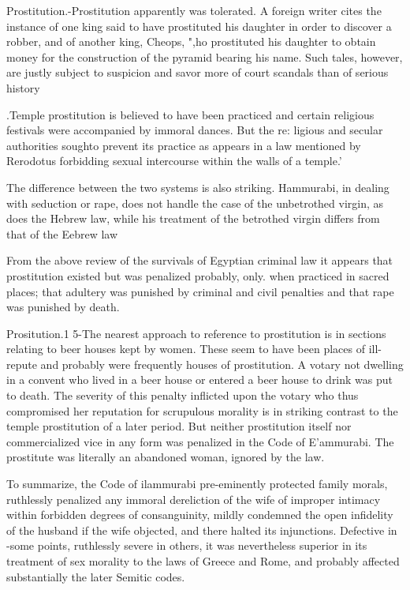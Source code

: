 \documentclass[11pt]{article}
\begin{document}
Prostitution.-Prostitution apparently was tolerated. A foreign
writer cites the instance of one king said to have prostituted his daughter in order to discover a robber, and of another king, Cheops, ",ho prostituted his daughter to obtain money for the construction of the
pyramid bearing his name. Such tales, however, are justly subject to
suspicion and savor more of court scandals than of serious history

.Temple prostitution is believed to have been practiced and certain
religious festivals were accompanied by immoral dances. But the re:
ligious and secular authorities soughto prevent its practice as appears
in a law mentioned by Rerodotus forbidding sexual intercourse within
the walls of a temple.' 



The difference between the two systems is also striking. Hammurabi, in dealing with seduction or rape, does not handle the case of
the unbetrothed virgin, as does the Hebrew law, while his treatment of
the betrothed virgin differs from that of the Eebrew law

From the above review of the survivals of Egyptian criminal law
it appears that prostitution existed but was penalized probably, only.
when practiced in sacred places; that adultery was punished by criminal
and civil penalties and that rape was punished by death.

Prositution.1 5-The nearest approach to reference to prostitution is
in sections relating to beer houses kept by women. These seem to have been
places of ill-repute and probably were frequently houses of prostitution. A votary not dwelling in a convent who lived in a beer house or
entered a beer house to drink was put to death. The severity of this
penalty inflicted upon the votary who thus compromised her reputation for scrupulous morality is in striking contrast to the temple prostitution of a later period. But neither prostitution itself nor commercialized vice in any form was penalized in the Code of E'ammurabi.
The prostitute was literally an abandoned woman, ignored by the law.

To summarize, the Code of ilammurabi pre-eminently protected
family morals, ruthlessly penalized any immoral dereliction of the wife
of improper intimacy within forbidden degrees of consanguinity, mildly
condemned the open infidelity of the husband if the wife objected, and
there halted its injunctions. Defective in -some points, ruthlessly severe
in others, it was nevertheless superior in its treatment of sex morality
to the laws of Greece and Rome, and probably affected substantially the
later Semitic codes.
\end{document}
